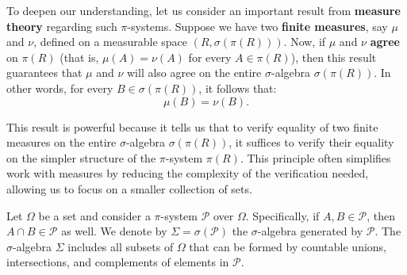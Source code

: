 To deepen our understanding, let us consider an important result from \textbf{measure theory} regarding such $\pi$-systems. Suppose we have two \textbf{finite measures}, say $\mu$ and $\nu$, defined on a measurable space $(R, \sigma(\pi(R)))$. Now, if $\mu$ and $\nu$ \textbf{agree} on $\pi(R)$ (that is, $\mu(A) = \nu(A)$ for every $A \in \pi(R)$), then this result guarantees that $\mu$ and $\nu$ will also agree on the entire $\sigma$-algebra $\sigma(\pi(R))$. In other words, for every $B \in \sigma(\pi(R))$, it follows that:
\[
\mu(B) = \nu(B).
\]

This result is powerful because it tells us that to verify equality of two finite measures on the entire $\sigma$-algebra $\sigma(\pi(R))$, it suffices to verify their equality on the simpler structure of the $\pi$-system $\pi(R)$. This principle often simplifies work with measures by reducing the complexity of the verification needed, allowing us to focus on a smaller collection of sets.\\

\begin{lemma}
    Let $\Omega$ be a set and consider a $\pi$-system $\mathcal{P}$ over $\Omega$. Specifically, if $A, B \in \mathcal{P}$, then $A \cap B \in \mathcal{P}$ as well. We denote by $\Sigma = \sigma(\mathcal{P})$ the $\sigma$-algebra generated by $\mathcal{P}$. The $\sigma$-algebra $\Sigma$ includes all subsets of $\Omega$ that can be formed by countable unions, intersections, and complements of elements in $\mathcal{P}$.
\end{lemma}

